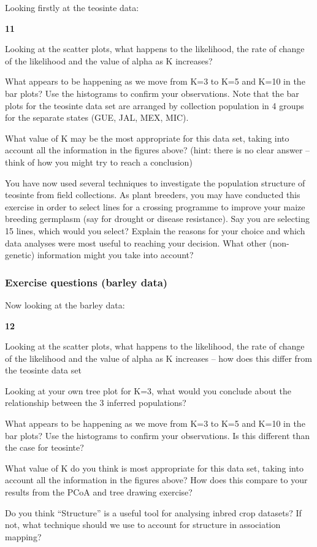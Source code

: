 \documentclass[
]{book}
\makeatletter
\newenvironment{kframe}{%
\medskip{}
\setlength{\fboxsep}{.8em}
 \def\at@end@of@kframe{}%
 \ifinner\ifhmode%
  \def\at@end@of@kframe{\end{minipage}}%
  \begin{minipage}{\columnwidth}%
 \fi\fi%
 \def\FrameCommand##1{\hskip\@totalleftmargin \hskip-\fboxsep
 \colorbox{shadecolor}{##1}\hskip-\fboxsep
     \hskip-\linewidth \hskip-\@totalleftmargin \hskip\columnwidth}%
 \MakeFramed {\advance\hsize-\width
   \@totalleftmargin\z@ \linewidth\hsize
   \@setminipage}}%
 {\par\unskip\endMakeFramed%
 \at@end@of@kframe}
\newenvironment{rmdblock}[1]
  {
  \begin{itemize}
  \renewcommand{\labelitemi}{
    \raisebox{-.7\height}[0pt][0pt]{
      {\setkeys{Gin}{width=3em,keepaspectratio}\texttt{[image: images/\#1]}}
    }
  }
  \setlength{\fboxsep}{1em}
  \begin{kframe}
  \item
  }
  {
  \end{kframe}
  \end{itemize}
  }
\newenvironment{rmdquiz}
  {\begin{rmdblock}{quiz}}
  {\end{rmdblock}}
\makeatother
\begin{document}
Looking firstly at the teosinte data:

\begin{rmdquiz}
\textbf{11}

Looking at the scatter plots, what happens to the likelihood, the rate of change of the likelihood and the value of alpha as K increases?

What appears to be happening as we move from K=3 to K=5 and K=10 in the bar plots? Use the histograms to confirm your observations. Note that the bar plots for the teosinte data set are arranged by collection population in 4 groups for the separate states (GUE, JAL, MEX, MIC).

What value of K may be the most appropriate for this data set, taking into account all the information in the figures above? (hint: there is no clear answer -- think of how you might try to reach a conclusion)

You have now used several techniques to investigate the population structure of teosinte from field collections. As plant breeders, you may have conducted this exercise in order to select lines for a crossing programme to improve your maize breeding germplasm (say for drought or disease resistance). Say you are selecting 15 lines, which would you select? Explain the reasons for your choice and which data analyses were most useful to reaching your decision. What other (non-genetic) information might you take into account?
\end{rmdquiz}

\hypertarget{exercise-questions-barley-data}{%
\subsubsection{Exercise questions (barley data)}\label{exercise-questions-barley-data}}

Now looking at the barley data:

\begin{rmdquiz}
\textbf{12}

Looking at the scatter plots, what happens to the likelihood, the rate of change of the likelihood and the value of alpha as K increases -- how does this differ from the teosinte data set

Looking at your own tree plot for K=3, what would you conclude about the relationship between the 3 inferred populations?

What appears to be happening as we move from K=3 to K=5 and K=10 in the bar plots? Use the histograms to confirm your observations. Is this different than the case for teosinte?

What value of K do you think is most appropriate for this data set, taking into account all the information in the figures above? How does this compare to your results from the PCoA and tree drawing exercise?

Do you think ``Structure'' is a useful tool for analysing inbred crop datasets? If not, what technique should we use to account for structure in association mapping?
\end{rmdquiz}
\end{document}
